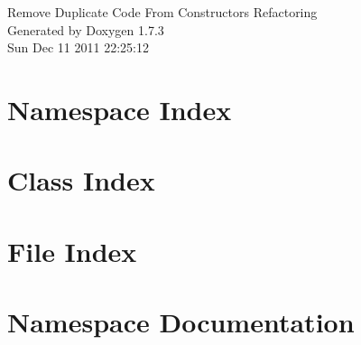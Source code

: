 \documentclass[a4paper]{book}
\begin{document}
\hypersetup{pageanchor=false}
\begin{titlepage}
\vspace*{7cm}
\begin{center}
{\Large Remove Duplicate Code From Constructors Refactoring }\\
\vspace*{1cm}
{\large Generated by Doxygen 1.7.3}\\
\vspace*{0.5cm}
{\small Sun Dec 11 2011 22:25:12}\\
\end{center}
\end{titlepage}
\clearemptydoublepage
{}
\tableofcontents
\clearemptydoublepage
{}
\hypersetup{pageanchor=true}
\chapter{Namespace Index}

\chapter{Class Index}

\chapter{File Index}

\chapter{Namespace Documentation}





\end{document}
